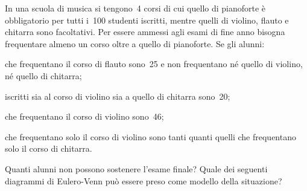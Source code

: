 \begin{esercizio}[\Ast]
 \label{ese:7.27}
In una scuola di musica si tengono~4 corsi di cui quello di pianoforte è obbligatorio
per tutti i~100 studenti iscritti, mentre quelli di violino, flauto e
chitarra sono facoltativi. Per essere ammessi agli esami di fine anno
bisogna frequentare almeno un corso oltre a quello di pianoforte. Se gli alunni:

\begin{enumeratea}
 \item che frequentano il corso di flauto sono~25 e non frequentano né quello di violino, né quello di chitarra;
 \item iscritti sia al corso di violino sia a quello di chitarra sono~20;
 \item che frequentano il corso di violino sono~46;
 \item che frequentano solo il corso di violino sono tanti quanti quelli che frequentano solo il corso di chitarra.
\end{enumeratea}

Quanti alunni non possono sostenere l'esame finale?
Quale dei seguenti diagrammi di Eulero-Venn può essere preso come modello della situazione?
\begin{center}
 
\end{center}

\end{esercizio}
